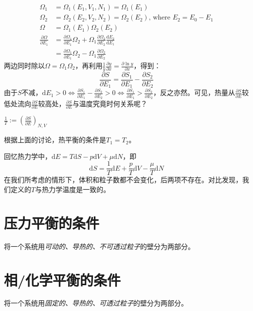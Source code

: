 \begin{align*}
    \Omega_1 & = \Omega_1(E_1, V_1, N_1) = \Omega_1(E_1) \\
    \Omega_2 & = \Omega_2(E_2, V_2, N_2) = \Omega_2(E_2) \text{, where } E_2 = E_0 - E_1 \\
    \Omega   & = \Omega_1(E_1)\Omega_2(E_2) \\
    \frac{\partial \Omega}{\partial E_1} 
    & = \frac{\partial \Omega_1}{\partial E_1} \Omega_2 
    + \Omega_1 \frac{\partial \Omega_2}{\partial E_2} \frac{\mathrm{d} E_2}{\mathrm{d} E_1} \\
    & = \frac{\partial \Omega_1}{\partial E_1} \Omega_2 - \Omega_1 \frac{\partial \Omega_2}{\partial E_2}
\end{align*}
两边同时除以$\Omega = \Omega_1 \Omega_2$，再利用$\frac{1}{y}\frac{\partial y}{\partial x} = \frac{\partial \ln y}{\partial x}$，得到：
\begin{equation*}
    \frac{\partial S}{\partial E_1} = \frac{\partial S_1}{\partial E_1} - \frac{\partial S_2}{\partial E_2}
\end{equation*}
由于$S$不减，$\mathrm{d}E_1 > 0 \iff \frac{\partial S_1}{\partial E_1} - \frac{\partial S_2}{\partial E_2} > 0 \iff \frac{\partial S_1}{\partial E_1} > \frac{\partial S_2}{\partial E_2}$，反之亦然。可见，热量从$\frac{\partial S}{\partial E}$较低处流向$\frac{\partial S}{\partial E}$较高处，$\frac{\partial S}{\partial E}$与温度究竟时何关系呢？
\begin{defn}
    $\frac{1}{T} := \left(\frac{\partial S}{\partial E}\right)_{N,V}$
\end{defn}
根据上面的讨论，热平衡的条件是$T_1 = T_2$。

回忆热力学中，$\mathrm{d}E = T\mathrm{d}S - p\mathrm{d}V + \mu \mathrm{d}N$，即
\begin{equation*}
    \mathrm{d}S = \frac{1}{T} \mathrm{d}E + \frac{p}{T}\mathrm{d}V - \frac{\mu}{T}\mathrm{d}N
\end{equation*}
在我们所考虑的情形下，体积和粒子数都不会变化，后两项不存在。对比发现，我们定义的$T$与热力学温度是一致的。


\section{压力平衡的条件}
将一个系统用\emph{可动的、导热的、不可透过粒子}的壁分为两部分。


\section{相/化学平衡的条件}
将一个系统用\emph{固定的、导热的、可透过粒子}的壁分为两部分。

